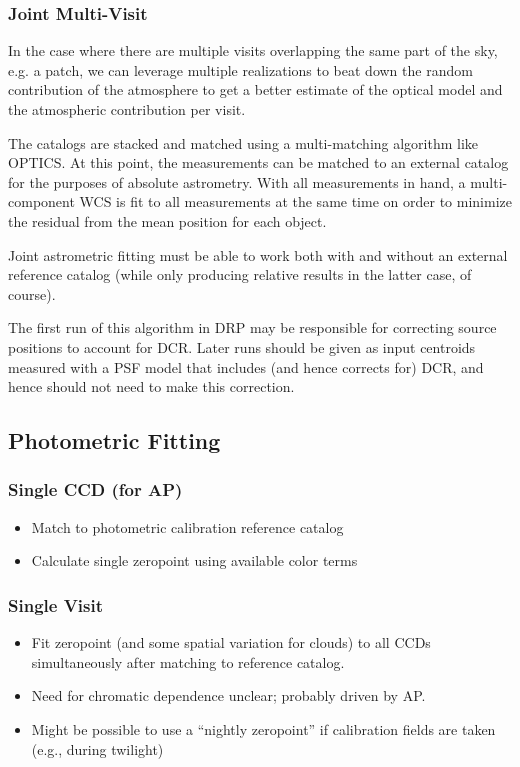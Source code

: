 \subsubsection{Joint Multi-Visit}
\label{sec:acJointAstrometricFit}
In the case where there are multiple visits overlapping the same part of the sky, e.g. a patch, we can leverage multiple realizations to beat down the random contribution of the atmosphere to get a better estimate of the optical model and the atmospheric contribution per visit.

The catalogs are stacked and matched using a multi-matching algorithm like OPTICS.  At this point, the measurements can be matched to an external catalog for the purposes of absolute astrometry.  With all measurements in hand, a multi-component WCS is fit to all measurements at the same time on order to minimize the residual from the mean position for each object.

Joint astrometric fitting must be able to work both with and without an external reference catalog (while only producing relative results in the latter case, of course).

The first run of this algorithm in DRP may be responsible for correcting source positions to account for DCR.  Later runs should be given as input centroids measured with a PSF model that includes (and hence corrects for) DCR, and hence should not need to make this correction.

\subsection{Photometric Fitting}
\label{sec:acPhotometricFitting}
\subsubsection{Single CCD (for AP)}
\label{sec:acSingleCCDPhotometricFit}
\begin{itemize}
\item Match to photometric calibration reference catalog
\item Calculate single zeropoint using available color terms
\end{itemize}
\subsubsection{Single Visit}
\label{sec:acSingleVisitPhotometricFit}
\begin{itemize}
\item Fit zeropoint (and some spatial variation for clouds) to all CCDs simultaneously after matching to reference catalog.
\item Need for chromatic dependence unclear; probably driven by AP.
\item Might be possible to use a ``nightly zeropoint'' if calibration fields are taken (e.g., during twilight)
\end{itemize}


